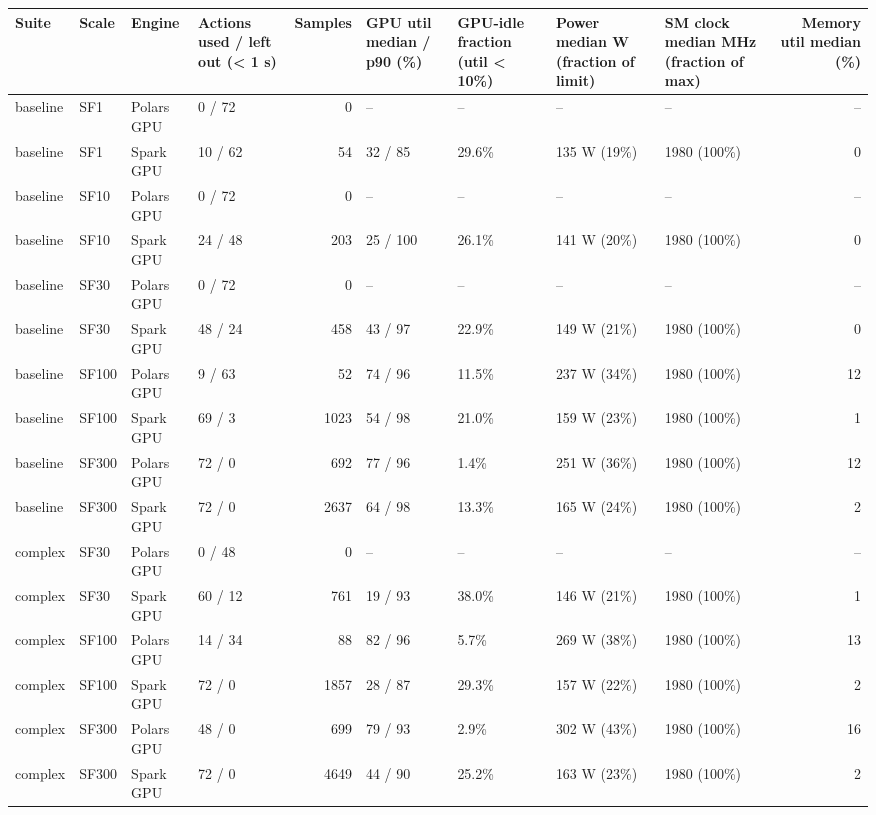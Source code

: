 \begin{longtable}{llllrllllr}
\toprule
Suite & Scale & Engine & Actions used / left out (< 1 s) & Samples & GPU util median / p90 (\%) & GPU-idle fraction (util < 10\%) & Power median W (fraction of limit) & SM clock median MHz (fraction of max) & Memory util median (\%) \\
\midrule
\endhead
\bottomrule
\endfoot
baseline & SF1 & Polars GPU & 0 / 72 & 0 & -- & -- & -- & -- & -- \\
baseline & SF1 & Spark GPU & 10 / 62 & 54 & 32 / 85 & 29.6\% & 135 W (19\%) & 1980 (100\%) & 0 \\
baseline & SF10 & Polars GPU & 0 / 72 & 0 & -- & -- & -- & -- & -- \\
baseline & SF10 & Spark GPU & 24 / 48 & 203 & 25 / 100 & 26.1\% & 141 W (20\%) & 1980 (100\%) & 0 \\
baseline & SF30 & Polars GPU & 0 / 72 & 0 & -- & -- & -- & -- & -- \\
baseline & SF30 & Spark GPU & 48 / 24 & 458 & 43 / 97 & 22.9\% & 149 W (21\%) & 1980 (100\%) & 0 \\
baseline & SF100 & Polars GPU & 9 / 63 & 52 & 74 / 96 & 11.5\% & 237 W (34\%) & 1980 (100\%) & 12 \\
baseline & SF100 & Spark GPU & 69 / 3 & 1023 & 54 / 98 & 21.0\% & 159 W (23\%) & 1980 (100\%) & 1 \\
baseline & SF300 & Polars GPU & 72 / 0 & 692 & 77 / 96 & 1.4\% & 251 W (36\%) & 1980 (100\%) & 12 \\
baseline & SF300 & Spark GPU & 72 / 0 & 2637 & 64 / 98 & 13.3\% & 165 W (24\%) & 1980 (100\%) & 2 \\
complex & SF30 & Polars GPU & 0 / 48 & 0 & -- & -- & -- & -- & -- \\
complex & SF30 & Spark GPU & 60 / 12 & 761 & 19 / 93 & 38.0\% & 146 W (21\%) & 1980 (100\%) & 1 \\
complex & SF100 & Polars GPU & 14 / 34 & 88 & 82 / 96 & 5.7\% & 269 W (38\%) & 1980 (100\%) & 13 \\
complex & SF100 & Spark GPU & 72 / 0 & 1857 & 28 / 87 & 29.3\% & 157 W (22\%) & 1980 (100\%) & 2 \\
complex & SF300 & Polars GPU & 48 / 0 & 699 & 79 / 93 & 2.9\% & 302 W (43\%) & 1980 (100\%) & 16 \\
complex & SF300 & Spark GPU & 72 / 0 & 4649 & 44 / 90 & 25.2\% & 163 W (23\%) & 1980 (100\%) & 2 \\
\end{longtable}
